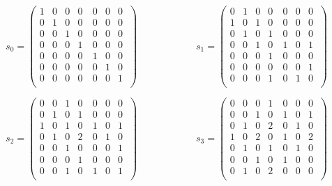 \documentclass[a4paper,11pt]{article}
\begin{document}
{\small
$$
s_0 = \left( \begin{array}{ccccccc}
   1 & 0 & 0 & 0 & 0 & 0 & 0 \\ 0 & 1 & 0 & 0 & 0 & 0 & 0 \\ 0 & 0 & 1 & 0 \
& 0 & 0 & 0 \\ 0 & 0 & 0 & 1 & 0 & 0 & 0 \\ 0 & 0 & 0 & 0 & 1 & 0 & 0 \
\\ 0 & 0 & 0 & 0 & 0 & 1 & 0 \\ 0 & 0 & 0 & 0 & 0 & 0 & 1 \\
\end{array}
\right)
\qquad \qquad \qquad
s_1 = \left( \begin{array}{ccccccc}
   0 & 1 & 0 & 0 & 0 & 0 & 0 \\ 1 & 0 & 1 & 0 & 0 & 0 & 0 \\ 0 & 1 & 0 & 1 \
& 0 & 0 & 0 \\ 0 & 0 & 1 & 0 & 1 & 0 & 1 \\ 0 & 0 & 0 & 1 & 0 & 0 & 0 \
\\ 0 & 0 & 0 & 0 & 0 & 0 & 1 \\ 0 & 0 & 0 & 1 & 0 & 1 & 0 \\
\end{array}
\right)
$$

$$
s_2 = \left( \begin{array}{ccccccc}
   0 & 0 & 1 & 0 & 0 & 0 & 0 \\ 0 & 1 & 0 & 1 & 0 & 0 & 0 \\ 1 & 0 & 1 & 0 \
& 1 & 0 & 1 \\ 0 & 1 & 0 & 2 & 0 & 1 & 0 \\ 0 & 0 & 1 & 0 & 0 & 0 & 1 \
\\ 0 & 0 & 0 & 1 & 0 & 0 & 0 \\ 0 & 0 & 1 & 0 & 1 & 0 & 1 \\
\end{array}
\right)
\qquad \qquad \qquad
s_3 = \left( \begin{array}{ccccccc}
   0 & 0 & 0 & 1 & 0 & 0 & 0 \\ 0 & 0 & 1 & 0 & 1 & 0 & 1 \\ 0 & 1 & 0 & 2 \
& 0 & 1 & 0 \\ 1 & 0 & 2 & 0 & 1 & 0 & 2 \\ 0 & 1 & 0 & 1 & 0 & 1 & 0 \
\\ 0 & 0 & 1 & 0 & 1 & 0 & 0 \\ 0 & 1 & 0 & 2 & 0 & 0 & 0 \\
\end{array}
\right)
$$

}
\end{document}
